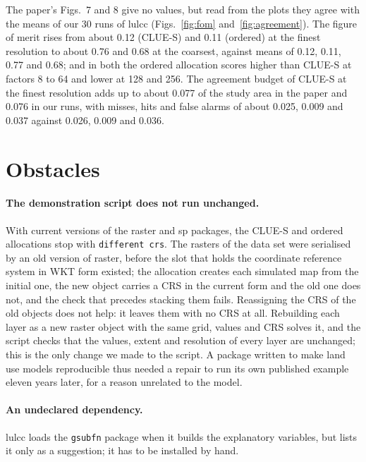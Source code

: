 The paper's Figs.~7 and 8 give no values, but read from the plots they agree with the
means of our 30 runs of lulcc (Figs.~\ref{fig:fom} and~\ref{fig:agreement}). The figure of
merit rises from about 0.12 (CLUE-S) and 0.11 (ordered) at the finest resolution to about
0.76 and 0.68 at the coarsest, against means of 0.12, 0.11, 0.77 and 0.68; and in both the
ordered allocation scores higher than CLUE-S at factors 8 to 64 and lower at 128
and 256. The
agreement budget of CLUE-S at the finest resolution adds up to about 0.077 of the study
area in the paper and 0.076 in our runs, with misses, hits and false alarms of about
0.025, 0.009 and 0.037 against 0.026, 0.009 and 0.036.



\section{Obstacles}
\label{sec:obstacles}

\paragraph{The demonstration script does not run unchanged.} With current versions of
the raster and sp packages, the CLUE-S and ordered allocations stop with
\texttt{different crs}. The rasters of the data set were serialised by an old version
of raster, before the slot that holds the coordinate reference system in WKT form
existed; the allocation creates each simulated map from the initial one, the new
object carries a CRS in the current form and the old one does not, and the check that
precedes stacking them fails. Reassigning the CRS of the old objects does not help: it
leaves them with no CRS at all. Rebuilding each layer as a new raster object with the
same grid, values and CRS solves it, and the script checks that the values, extent and
resolution of every layer are unchanged; this is the only change we made to the script. A
package written to make land use models reproducible thus needed a repair to run
its own published example eleven years later, for a reason unrelated to the model.

\paragraph{An undeclared dependency.} lulcc loads the \texttt{gsubfn} package when it
builds the explanatory variables, but lists it only as a suggestion; it has to be
installed by hand.

